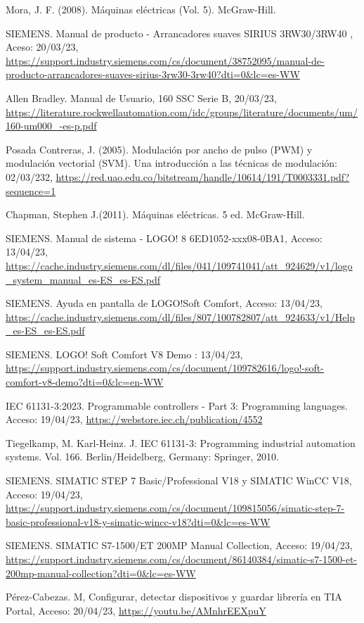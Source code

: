 \begin{thebibliography}{9}
		 Mora, J. F. (2008). Máquinas eléctricas (Vol. 5). McGraw-Hill.
		
SIEMENS. Manual de producto - Arrancadores suaves SIRIUS 3RW30/3RW40 , Aceso: 20/03/23, \url{https://support.industry.siemens.com/cs/document/38752095/manual-de-producto-arrancadores-suaves-sirius-3rw30-3rw40?dti=0&lc=es-WW}

Allen Bradley. Manual de Usuario, 160 SSC Serie B, 20/03/23, \url{https://literature.rockwellautomation.com/idc/groups/literature/documents/um/160-um000_-es-p.pdf}

 Posada Contreras, J. (2005). Modulación por ancho de pulso (PWM) y modulación vectorial (SVM). Una introducción a las técnicas de modulación: 02/03/232, \url{https://red.uao.edu.co/bitstream/handle/10614/191/T0003331.pdf?sequence=1}


 Chapman, Stephen J.(2011). Máquinas eléctricas. 5 ed. McGraw-Hill.	

SIEMENS. Manual de sistema - LOGO! 8  6ED1052-xxx08-0BA1, Acceso: 13/04/23, \url{https://cache.industry.siemens.com/dl/files/041/109741041/att_924629/v1/logo_system_manual_es-ES_es-ES.pdf}

SIEMENS. Ayuda en pantalla de LOGO!Soft Comfort, Acceso: 13/04/23, \url{https://cache.industry.siemens.com/dl/files/807/100782807/att_924633/v1/Help_es-ES_es-ES.pdf}

SIEMENS. LOGO! Soft Comfort V8 Demo : 13/04/23, \url{https://support.industry.siemens.com/cs/document/109782616/logo!-soft-comfort-v8-demo?dti=0&lc=en-WW}

IEC 61131-3:2023. Programmable controllers - Part 3: Programming languages. Acceso: 19/04/23,
\url{https://webstore.iec.ch/publication/4552}

Tiegelkamp, M. Karl-Heinz. J. IEC 61131-3: Programming industrial automation systems. Vol. 166. Berlin/Heidelberg, Germany: Springer, 2010.

SIEMENS. SIMATIC STEP 7 Basic/Professional V18 y SIMATIC WinCC V18, Acceso: 19/04/23, \url{https://support.industry.siemens.com/cs/document/109815056/simatic-step-7-basic-professional-v18-y-simatic-wincc-v18?dti=0&lc=es-WW}

SIEMENS. SIMATIC S7-1500/ET 200MP Manual Collection, Acceso: 19/04/23, \url{https://support.industry.siemens.com/cs/document/86140384/simatic-s7-1500-et-200mp-manual-collection?dti=0&lc=es-WW}


Pérez-Cabezas. M, Configurar, detectar dispositivos y guardar librería en TIA Portal, Acceso: 20/04/23, \url{https://youtu.be/AMnhrEEXpuY}


\end{thebibliography}